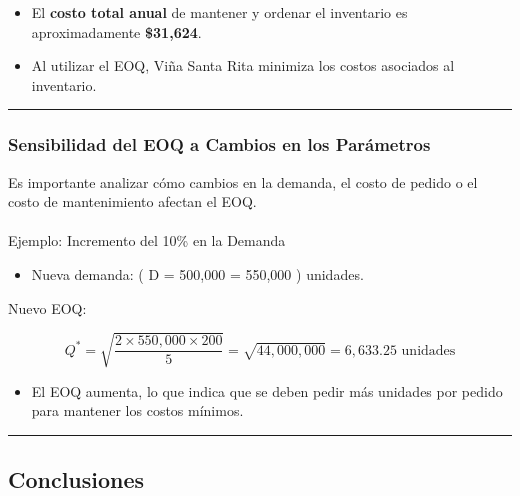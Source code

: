 \documentclass[
  letterpaper,
  DIV=11,
  numbers=noendperiod]{scrartcl}
\makeatletter
\let\oldparagraph\paragraph
\renewcommand{\paragraph}{
    \@ifstar
      \xxxParagraphStar
      \xxxParagraphNoStar
  }
\newcommand{\xxxParagraphStar}[1]{\oldparagraph*{#1}\mbox{}}
\newcommand{\xxxParagraphNoStar}[1]{\oldparagraph{#1}\mbox{}}
\providecommand{\tightlist}{%
  \setlength{\itemsep}{0pt}\setlength{\parskip}{0pt}}\usepackage{longtable,booktabs,array}
\makeatother
\begin{document}
\begin{itemize}
\tightlist
\item
  El \textbf{costo total anual} de mantener y ordenar el inventario es
  aproximadamente \textbf{\$31,624}.
\item
  Al utilizar el EOQ, Viña Santa Rita minimiza los costos asociados al
  inventario.
\end{itemize}

\begin{center}\rule{0.5\linewidth}{0.5pt}\end{center}

\subsubsection{Sensibilidad del EOQ a Cambios en los
Parámetros}\label{sensibilidad-del-eoq-a-cambios-en-los-paruxe1metros}

Es importante analizar cómo cambios en la demanda, el costo de pedido o
el costo de mantenimiento afectan el EOQ.

\paragraph{Ejemplo: Incremento del 10\% en la
Demanda}\label{ejemplo-incremento-del-10-en-la-demanda}

\begin{itemize}
\tightlist
\item
  Nueva demanda: ( D = 500,000  = 550,000 ) unidades.
\end{itemize}

Nuevo EOQ:

\[
Q^* = \sqrt{\dfrac{2 \times 550,000 \times 200}{5}} = \sqrt{44,000,000} = 6,633.25 \text{ unidades}
\]

\begin{itemize}
\tightlist
\item
  El EOQ aumenta, lo que indica que se deben pedir más unidades por
  pedido para mantener los costos mínimos.
\end{itemize}

\begin{center}\rule{0.5\linewidth}{0.5pt}\end{center}

\subsection{Conclusiones}\label{conclusiones-1}
\end{document}
